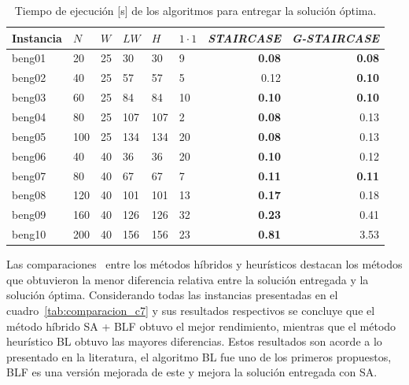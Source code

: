 \documentclass[letter, 10pt]{article}
\begin{document}
\renewcommand{\arraystretch}{1.15}
\begin{table}[H]
    \centering
    \begin{tabular}{|l|lllll|rr|}
    \hline
    Instancia & \multicolumn{1}{l}{$N$} & \multicolumn{1}{l}{$W$} & \multicolumn{1}{l}{$LW$} & \multicolumn{1}{l}{$H$} & \multicolumn{1}{l|}{$1 \cdot 1$} & \multicolumn{1}{l}{\emph{STAIRCASE}} & \multicolumn{1}{l|}{\emph{G-STAIRCASE}} \\ \hline
    beng01 & 20 & 25 & 30 & 30 & 9 & \textbf{0.08} & \textbf{0.08} \\ \hline
    beng02 & 40 & 25 & 57 & 57 & 5 & 0.12 & \textbf{0.10} \\ \hline
    beng03 & 60 & 25 & 84 & 84 & 10 & \textbf{0.10} & \textbf{0.10} \\ \hline
    beng04 & 80 & 25 & 107 & 107 & 2 & \textbf{0.08} & 0.13 \\ \hline
    beng05 & 100 & 25 & 134 & 134 & 20 & \textbf{0.08} & 0.13 \\ \hline
    beng06 & 40 & 40 & 36 & 36 & 20 & \textbf{0.10} & 0.12 \\ \hline
    beng07 & 80 & 40 & 67 & 67 & 7 & \textbf{0.11} & \textbf{0.11} \\ \hline
    beng08 & 120 & 40 & 101 & 101 & 13 & \textbf{0.17} & 0.18 \\ \hline
    beng09 & 160 & 40 & 126 & 126 & 32 & \textbf{0.23} & 0.41 \\ \hline
    beng10 & 200 & 40 & 156 & 156 & 23 & \textbf{0.81} & 3.53 \\ \hline
    \end{tabular}
    \caption{Tiempo de ejecuci\'on [s] de los algoritmos para entregar la soluci\'on \'optima.}
    \label{tab:comparacion_beng10}
\end{table}

Las comparaciones~\cite{hopper2001empirical} entre los m\'etodos h\'ibridos y heur\'isticos destacan los m\'etodos que obtuvieron la menor diferencia relativa entre la soluci\'on entregada y la soluci\'on \'optima. Considerando todas las instancias presentadas en el cuadro~\ref{tab:comparacion_c7} y sus resultados respectivos se concluye que el m\'etodo h\'ibrido SA + BLF obtuvo el mejor rendimiento, mientras que el m\'etodo heur\'istico BL obtuvo las mayores diferencias. Estos resultados son acorde a lo presentado en la literatura, el algoritmo BL fue uno de los primeros propuestos, BLF es una versi\'on mejorada de este y mejora la soluci\'on entregada con SA.
\end{document}
